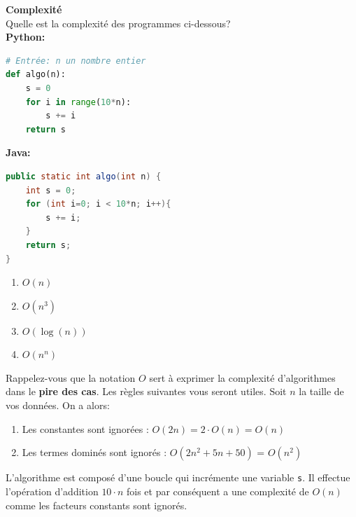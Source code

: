 \begin{Exercice}[10 minutes] \textbf{Complexité} \\

    Quelle est la complexité des programmes ci-dessous?\\
    \textbf{Python:}
    \begin{lstlisting}[language=Python]
# Entrée: n un nombre entier
def algo(n):
    s = 0
    for i in range(10*n):
        s += i
    return s \end{lstlisting}
    
    \textbf{Java:}
    \begin{lstlisting}[language=Java]
public static int algo(int n) {
    int s = 0;
    for (int i=0; i < 10*n; i++){
        s += i;
    }
    return s;
}  \end{lstlisting}

    \begin{enumerate}[label=(\Alph*)]
        \item $O(n)$
        \item $O(n^3)$
        \item $O(\log(n))$
        \item $O(n^n)$
    \end{enumerate}
    
    \begin{conseil}
    Rappelez-vous que la notation $O$ sert à exprimer la complexité d'algorithmes dans le \textbf{pire des cas}. Les règles suivantes vous seront utiles. Soit $n$ la taille de vos données. On a alors:
    \begin{enumerate}
        \item Les constantes sont ignorées : $O(2n) = 2 \cdot O(n) = O(n)$
        \item Les termes dominés sont ignorés : $O(2n^2+5n+50)$ = $O(n^2)$
    \end{enumerate}
    \end{conseil}

    \begin{solution}
        L'algorithme est composé d'une boucle qui incrémente une variable \lstinline{s}. Il effectue l'opération d'addition $10 \cdot n$ fois et par conséquent a une complexité de $O(n)$ comme les facteurs constants sont ignorés.
    \end{solution}
\end{Exercice}


